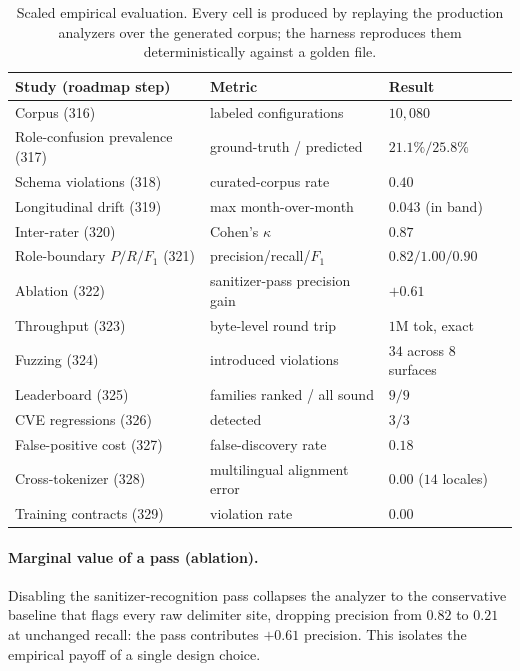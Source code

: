 \documentclass[10pt]{article}
\begin{document}
\begin{table}[t]
\centering
\small
\begin{tabular}{lll}
\toprule
Study (roadmap step) & Metric & Result \\
\midrule
Corpus (316) & labeled configurations & $10{,}080$ \\
Role-confusion prevalence (317) & ground-truth / predicted & $21.1\% / 25.8\%$ \\
Schema violations (318) & curated-corpus rate & $0.40$ \\
Longitudinal drift (319) & max month-over-month & $0.043$ (in band) \\
Inter-rater (320) & Cohen's $\kappa$ & $0.87$ \\
Role-boundary $P/R/F_1$ (321) & precision/recall/$F_1$ & $0.82 / 1.00 / 0.90$ \\
Ablation (322) & sanitizer-pass precision gain & $+0.61$ \\
Throughput (323) & byte-level round trip & $1\mathrm{M}$ tok, exact \\
Fuzzing (324) & introduced violations & $34$ across $8$ surfaces \\
Leaderboard (325) & families ranked / all sound & $9 / 9$ \\
CVE regressions (326) & detected & $3/3$ \\
False-positive cost (327) & false-discovery rate & $0.18$ \\
Cross-tokenizer (328) & multilingual alignment error & $0.00$ ($14$ locales) \\
Training contracts (329) & violation rate & $0.00$ \\
\bottomrule
\end{tabular}
\caption{Scaled empirical evaluation. Every cell is produced by replaying the
production analyzers over the generated corpus; the harness reproduces them
deterministically against a golden file.}
\label{tab:scaled-eval}
\end{table}

\paragraph{Marginal value of a pass (ablation).}
Disabling the sanitizer-recognition pass collapses the analyzer to the
conservative baseline that flags every raw delimiter site, dropping precision
from $0.82$ to $0.21$ at unchanged recall: the pass contributes
$+0.61$ precision. This isolates the empirical payoff of a single design choice.
\end{document}
